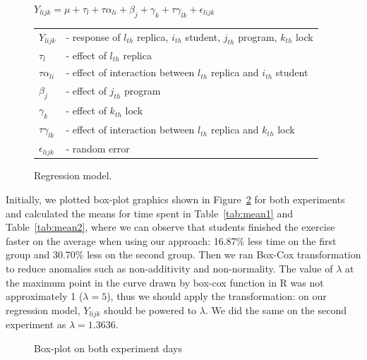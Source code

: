 \begin{figure}
\begin{center}
$Y_{lijk} = \mu + \tau_{l} + \tau\alpha_{li} + \beta_{j} + \gamma_{k} + \tau\gamma_{lk} + \epsilon_{lijk}$\\
\vspace{4mm}
\begin{tabular}{ll}
$Y_{lijk}$ & - response of $l_{th}$ replica, $i_{th}$ student, $j_{th}$ program, $k_{th}$ lock \\
$\tau_{l}$ & - effect of $l_{th}$ replica \\
$\tau\alpha_{li}$ & - effect of interaction between $l_{th}$ replica and $i_{th}$ student \\
$\beta_{j}$ & - effect of $j_{th}$ program \\
$\gamma_{k}$ & - effect of $k_{th}$ lock \\
$\tau\gamma_{lk}$ & - effect of interaction between $l_{th}$ replica and $k_{th}$ lock \\
$\epsilon_{lijk}$ & - random error \\
\end{tabular}
\caption{Regression model.}\label{fig:model}
\end{center}
\end{figure}

Initially, we plotted box-plot graphics shown in Figure~\ref{fig:boxplots} for both experiments and calculated the means for time spent in Table~\ref{tab:mean1} and Table~\ref{tab:mean2}, where we can observe that students finished the exercise faster on the average when using our approach: 16.87\% less time on the first group and 30.70\% less on the second group. Then we ran Box-Cox transformation to reduce anomalies such as non-additivity and non-normality. The value of $\lambda$ at the maximum point in the curve drawn by box-cox function in R was not approximately 1 ($\lambda = 5$), thus we should apply the transformation: on our regression model, $Y_{lijk}$ should be powered to $\lambda$. We did the same on the second experiment as $\lambda = 1.3636$.

\begin{figure}%
    \centering
    \qquad
    \caption{Box-plot on both experiment days}\label{fig:boxplots}%
\end{figure}

